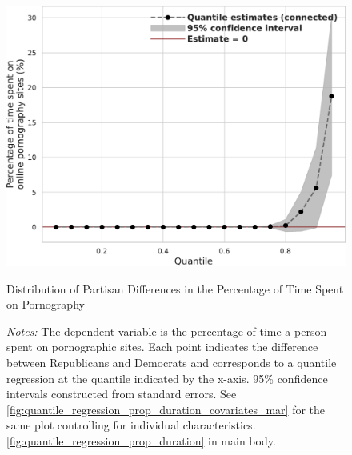 \documentclass[12pt,twoside]{article}
\begin{document}
\begin{figure}[t]
	\centering
	\includegraphics[width=.7\linewidth]{figs/mar/quantile_reg_proportion_duration_adult.pdf}
	\caption{Distribution of Partisan Differences in the Percentage of Time Spent on Pornography}
	\caption*{\footnotesize \emph{Notes:} 
		The dependent variable is the percentage of time a person spent on pornographic sites.
		Each point indicates the difference between Republicans and Democrats and corresponds to a quantile regression at the quantile indicated by the x-axis.
		95\% confidence intervals constructed from standard errors.
		See \cref{fig:quantile_regression_prop_duration_covariates_mar} for the same plot controlling for individual characteristics.
            \cref{fig:quantile_regression_prop_duration} in main body.
	}
	\label{fig:quantile_regression_prop_duration_mar}
\end{figure}
\end{document}
